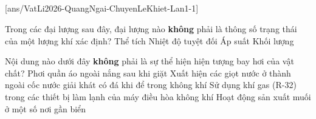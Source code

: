 \def\CheDo{solcolor}%
\def\tenchuong{THPT chuyên Lê Khiết, Quảng Ngãi -- Lần 1}
\def\thuonghieu{VẬT LÍ 12 -- Eduzy.com.vn}
\def\TachCauDS{1}
\def\TachCauLG{1}




	\noindent
	\subsection*{}
	\setcounter{ex}{0}
	[ans/VatLi2026-QuangNgai-ChuyenLeKhiet-Lan1-1]

	\begin{ex}%
		Trong các đại lượng sau đây, đại lượng nào \textbf{không} phải là thông số trạng thái của một lượng khí xác định?
		\choice
		{Thể tích}
		{Nhiệt độ tuyệt đối}
		{Áp suất}
		{\True Khối lượng}
	\end{ex}

	\begin{ex}%
		Nội dung nào dưới đây \textbf{không} phải là sự thể hiện hiện tượng bay hơi của vật chất?
		\choice
		{Phơi quần áo ngoài nắng sau khi giặt}
		{\True Xuất hiện các giọt nước ở thành ngoài cốc nước giải khát có đá khi để trong không khí}
		{Sử dụng khí gas (R-32) trong các thiết bị làm lạnh của máy điều hòa không khí}
		{Hoạt động sản xuất muối ở một số nơi gần biển}
	\end{ex}

